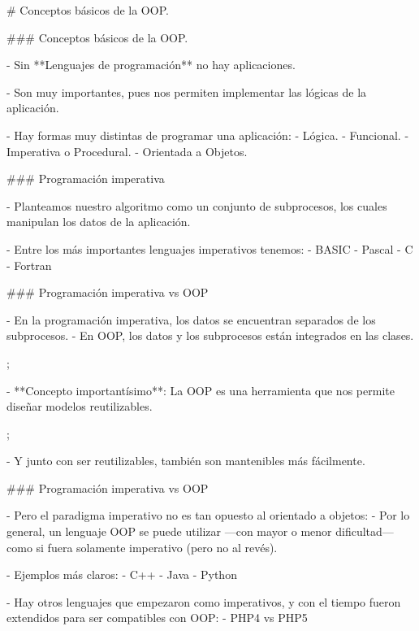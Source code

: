 # Conceptos básicos de la OOP.

### Conceptos básicos de la OOP.

- Sin **Lenguajes de programación** no hay aplicaciones.

\pause
\vfill

- Son muy importantes, pues nos permiten implementar las lógicas de la aplicación.

\pause
\vfill

- Hay formas muy distintas de programar una aplicación: 
    - Lógica.
    - Funcional.
    - Imperativa o Procedural.
    - Orientada a Objetos.

### Programación imperativa

- Planteamos nuestro algoritmo como un conjunto de subprocesos, los cuales manipulan los datos
de la aplicación.

\pause \vfill

- Entre los más importantes lenguajes imperativos tenemos:
    - BASIC
    - Pascal
    - C
    - Fortran

### Programación imperativa vs OOP

- En la programación imperativa, los datos se encuentran separados de los subprocesos.\vfill
- En OOP, los datos y los subprocesos están integrados en las clases.

\centering\begin{tikzflowchart}
  ;
\end{tikzflowchart}
\vfill

- **Concepto importantísimo**: La OOP es una herramienta que nos permite diseñar modelos
reutilizables.

\centering\begin{tikzflowchart}
  ;
\end{tikzflowchart}

- Y junto con ser reutilizables, también son mantenibles más fácilmente.

### Programación imperativa vs OOP

- Pero el paradigma imperativo no es tan opuesto al orientado a objetos:
    - Por lo general, un lenguaje OOP se puede utilizar ---con mayor o menor dificultad--- como
    si fuera solamente imperativo (pero no al revés).

- Ejemplos más claros:
    - C++
    - Java
    - Python

- Hay otros lenguajes que empezaron como imperativos, y con el tiempo fueron extendidos
para ser compatibles con OOP:
    - PHP4 vs PHP5

